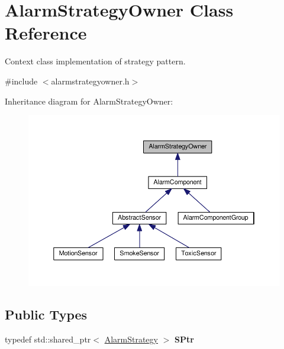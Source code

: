 \hypertarget{classAlarmStrategyOwner}{}\section{Alarm\+Strategy\+Owner Class Reference}
\label{classAlarmStrategyOwner}


Context class implementation of strategy pattern.  




{\ttfamily \#include $<$alarmstrategyowner.\+h$>$}



Inheritance diagram for Alarm\+Strategy\+Owner\+:\nopagebreak
\begin{figure}[H]
\begin{center}
\leavevmode
\includegraphics[width=350pt]{classAlarmStrategyOwner__inherit__graph}
\end{center}
\end{figure}
\subsection*{Public Types}
\begin{DoxyCompactItemize}
\item 
typedef std\+::shared\+\_\+ptr$<$ \hyperlink{classAlarmStrategy}{Alarm\+Strategy} $>$ {\bfseries S\+Ptr}\hypertarget{classAlarmStrategyOwner_aeebd31011e2a6d14a4492315ad15c5ee}{}\label{classAlarmStrategyOwner_aeebd31011e2a6d14a4492315ad15c5ee}

\end{DoxyCompactItemize}
